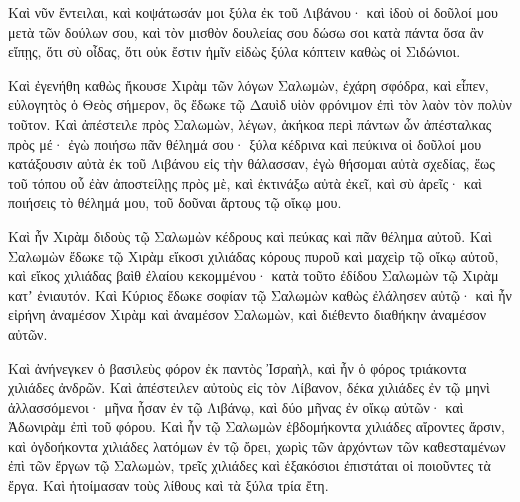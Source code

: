 {Καὶ νῦν ἔντειλαι, καὶ κοψάτωσάν μοι ξύλα ἐκ τοῦ Λιβάνου· καὶ ἰδοὺ οἱ δοῦλοί μου μετὰ τῶν δούλων σου, καὶ τὸν μισθὸν δουλείας σου δώσω σοι κατὰ πάντα ὅσα ἂν εἴπῃς, ὅτι σὺ οἶδας, ὅτι οὐκ ἔστιν ἡμῖν εἰδὼς ξύλα κόπτειν καθὼς οἱ Σιδώνιοι.
\par }{\PP {}Καὶ ἐγενήθη καθὼς ἤκουσε Χιρὰμ τῶν λόγων Σαλωμὼν, ἐχάρη σφόδρα, καὶ εἶπεν, εὐλογητὸς ὁ Θεὸς σήμερον, ὃς ἔδωκε τῷ Δαυὶδ υἱὸν φρόνιμον ἐπὶ τὸν λαὸν τὸν πολὺν τοῦτον.
Καὶ ἀπέστειλε πρὸς Σαλωμὼν, λέγων, ἀκήκοα περὶ πάντων ὧν ἀπέσταλκας πρὸς μέ· ἐγὼ ποιήσω πᾶν θέλημά σου· ξύλα κέδρινα καὶ πεύκινα
οἱ δοῦλοί μου κατάξουσιν αὐτὰ ἐκ τοῦ Λιβάνου εἰς τὴν θάλασσαν, ἐγὼ θήσομαι αὐτὰ σχεδίας, ἕως τοῦ τόπου οὗ ἐὰν ἀποστείλῃς πρὸς μὲ, καὶ ἐκτινάξω αὐτὰ ἐκεῖ, καὶ σὺ ἀρεῖς· καὶ ποιήσεις τὸ θέλημά μου, τοῦ δοῦναι ἄρτους τῷ οἴκῳ μου.
\par }{\PP {}Καὶ ἦν Χιρὰμ διδοὺς τῷ Σαλωμὼν κέδρους καὶ πεύκας καὶ πᾶν θέλημα αὐτοῦ.
Καὶ Σαλωμὼν ἔδωκε τῷ Χιρὰμ εἴκοσι χιλιάδας κόρους πυροῦ καὶ μαχεὶρ τῷ οἴκῳ αὐτοῦ, καὶ εἴκος χιλιάδας βαὶθ ἐλαίου κεκομμένου· κατὰ τοῦτο ἐδίδου Σαλωμὼν τῷ Χιρὰμ κατʼ ἐνιαυτόν.
Καὶ Κύριος ἔδωκε σοφίαν τῷ Σαλωμὼν καθὼς ἐλάλησεν αὐτῷ· καὶ ἦν εἰρήνη ἀναμέσον Χιρὰμ καὶ ἀναμέσον Σαλωμὼν, καὶ διέθεντο διαθήκην ἀναμέσον αὐτῶν.
\par }{\PP {}Καὶ ἀνήνεγκεν ὁ βασιλεὺς φόρον ἐκ παντὸς Ἰσραὴλ, καὶ ἦν ὁ φόρος τριάκοντα χιλιάδες ἀνδρῶν.
Καὶ ἀπέστειλεν αὐτοὺς εἰς τὸν Λίβανον, δέκα χιλιάδες ἐν τῷ μηνὶ ἀλλασσόμενοι· μῆνα ἦσαν ἐν τῷ Λιβάνῳ, καὶ δύο μῆνας ἐν οἴκῳ αὐτῶν· καὶ Ἀδωνιρὰμ ἐπὶ τοῦ φόρου.
Καὶ ἦν τῷ Σαλωμὼν ἑβδομήκοντα χιλιάδες αἴροντες ἄρσιν, καὶ ὀγδοήκοντα χιλιάδες λατόμων ἐν τῷ ὄρει,
χωρὶς τῶν ἀρχόντων τῶν καθεσταμένων ἐπὶ τῶν ἔργων τῷ Σαλωμὼν, τρεῖς χιλιάδες καὶ ἑξακόσιοι ἐπιστάται οἱ ποιοῦντες τὰ ἔργα.
Καὶ ἡτοίμασαν τοὺς λίθους καὶ τὰ ξύλα τρία ἔτη.

}
